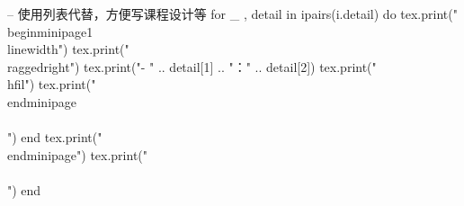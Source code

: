 \documentclass[10pt, a4paper, oneside]{ctexart}
\begin{document}
\begin{center}
\begin{minipage}{0.9\textwidth}
\begin{luacode}
                -- 使用列表代替，方便写课程设计等
                for _ , detail in ipairs(i.detail) do
                    tex.print("\\begin{minipage}{1\\linewidth}")
                    tex.print("\\raggedright")
                    tex.print("- " .. detail[1] .. "：" .. detail[2])
                    tex.print("\\hfil")
                    tex.print("\\end{minipage}\\\\[0.5em]")
                end
                tex.print("\\end{minipage}")
                tex.print("\\\\[0.3em]")
            end
        \end{luacode}
    \end{minipage}
\end{center}
\fi
\end{document}
